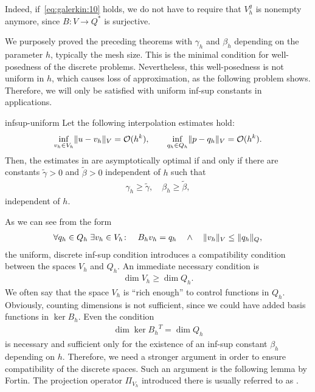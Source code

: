 \begin{remark}
  Indeed, if~\eqref{eq:galerkin:10} holds, we do not have to require
  that $V_h^g$ is nonempty anymore, since $B\colon V\to Q^*$ is
  surjective.
\end{remark}

\begin{remark}
  We purposely proved the preceding theorems with $\gamma_h$ and
  $\beta_h$ depending on the parameter $h$, typically the mesh
  size. This is the minimal condition for well-posedness of the
  discrete problems. Nevertheless, this well-posedness is not uniform
  in $h$, which causes loss of approximation, as the following problem
  shows. Therefore, we will only be satisfied with uniform inf-sup
  constants in applications.
\end{remark}

\begin{Problem}{infsup-uniform}
  Let the following interpolation estimates hold:
  \begin{gather*}
    \inf_{v_h\in V_h}\lVert u-v_h\rVert_V = \mathcal O(h^k),
    \qquad
    \inf_{q_h\in Q_h}\lVert p-q_h\rVert_V = \mathcal O(h^k).
  \end{gather*}
  Then, the estimates in
   are asymptotically
  optimal if and only if there are constants $\tilde \gamma>0$ and
  $\tilde \beta>0$ independent of $h$ such that
  \begin{gather}
    \label{eq:galerkin:14}
    \gamma_h\ge \tilde\gamma,\quad\beta_h\ge\tilde\beta,
  \end{gather}
  independent of $h$.
\end{Problem}

\begin{intro}
  As we can see from the form
  \begin{gather*}
    \forall q_h\in Q_h \;
    \exists  v_h\in V_h\colon
    \quad B_h v_h = q_h
    \quad\wedge\quad
    \lVert v_h\rVert_V \le \lVert q_h\rVert_Q,
  \end{gather*}
  the uniform, discrete inf-sup condition introduces a compatibility
  condition between the spaces $V_h$ and $Q_h$. An immediate necessary
  condition is
  \begin{gather}
    \dim V_h \ge \dim Q_h.
  \end{gather}
  We often say that the space $V_h$ is ``rich enough'' to control
  functions in $Q_h$. Obviously, counting dimensions is not
  sufficient, since we could have added basis functions in
  $\ker{B_h}$. Even the condition
  \begin{gather*}
    \dim\ker{B_h}^T = \dim Q_h
  \end{gather*}
  is necessary and sufficient only for the existence of an inf-sup
  constant $\beta_h$ depending on $h$. Therefore, we need a stronger
  argument in order to ensure compatibility of the discrete
  spaces. Such an argument is the following lemma by Fortin. The
  projection operator $\Pi_{V_h}$ introduced there is usually referred
  to as .
\end{intro}

